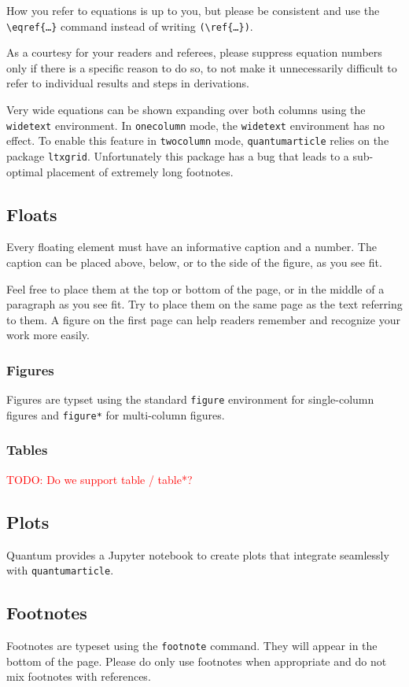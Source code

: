 \documentclass[a4paper,noarxiv,onecolumn]{quantumarticle}
\newcommand{\todo}[1]{\textcolor{red}{TODO: #1}}
\begin{document}
	How you refer to equations is up to you, but please be consistent and use the \texttt{\textbackslash{}eqref\{\dots\}} command instead of writing \texttt{(\textbackslash{}ref\{\dots\})}.
	
	As a courtesy for your readers and referees, please suppress equation numbers only if there is a specific reason to do so, to not make it unnecessarily difficult to refer to individual results and steps in derivations.
	
	Very wide equations can be shown expanding over both columns using the \texttt{widetext} environment.
	In \texttt{onecolumn} mode, the \texttt{widetext} environment has no effect.
	To enable this feature in \texttt{twocolumn} mode, \texttt{quantumarticle} relies on the package \texttt{ltxgrid}.
	Unfortunately this package has a bug that leads to a sub-optimal placement of extremely long footnotes.
	
	\subsection{Floats}	
	Every floating element must have an informative caption and a number. The caption can be placed above, below, or to the side of the figure, as you see fit.
	
	Feel free to place them at the top or bottom of the page, or in the middle of a paragraph as you see fit. Try to place them on the same page as the text referring to them. A figure on the first page can help readers remember and recognize your work more easily.
	
	\subsubsection{Figures}
	Figures are typset using the standard \texttt{figure} environment for single-column figures and \texttt{figure*} for multi-column figures. 
	
	\subsubsection{Tables}
	\todo{Do we support table / table*?}
	
	\subsection{Plots}
	Quantum provides a Jupyter notebook to create plots that integrate seamlessly with \texttt{quantumarticle}.
	
	\subsection{Footnotes}
	Footnotes are typeset using the \texttt{footnote} command. They will appear in the bottom of the page. Please do only use footnotes when appropriate and do not mix footnotes with references.
	
\end{document}
